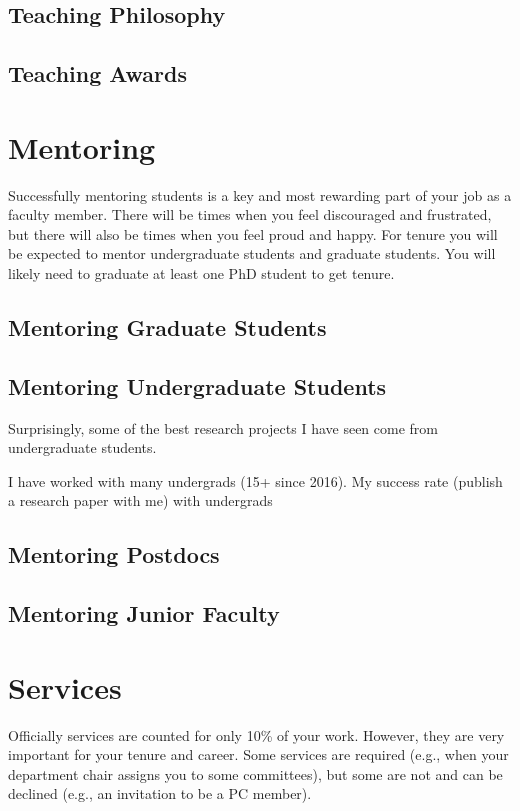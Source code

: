 \documentclass[oneside,11pt,dvipsnames]{book}
\begin{document}
\section{Teaching Philosophy}
\section{Teaching Awards}



\chapter{Mentoring}

Successfully mentoring students is a key and most rewarding part of your job as a faculty member. 
There will be times when you feel discouraged and frustrated, but there will also be times when you feel proud and happy.  
For tenure you will be expected to mentor undergraduate students and graduate students. You will likely need to graduate at least one PhD student to get tenure.

\section{Mentoring Graduate Students}


\section{Mentoring Undergraduate Students}
Surprisingly, some of the best research projects I have seen come from undergraduate students.  


I have worked with many undergrads (15+ since 2016). My success rate (publish a research paper with me) with undergrads 


\section{Mentoring Postdocs}
\section{Mentoring Junior Faculty}

\chapter{Services}\label{sec:services}


Officially services are counted for only 10\% of your work. However, they are very important for your tenure and career.
Some services are required (e.g., when your department chair assigns you to some committees), but some are not and can be declined (e.g., an invitation to be a PC member).  
\end{document}
